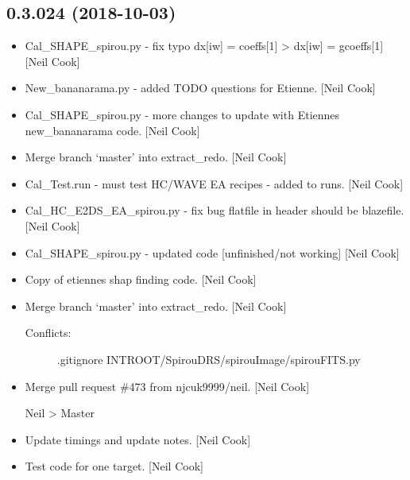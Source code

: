 \documentclass[a4paper,10pt,english]{report}
\begin{document}
\subsection{0.3.024 (2018-10-03)}
\label{\detokenize{misc/changelog:id306}}\begin{itemize}
\item {} 
Cal\_SHAPE\_spirou.py - fix typo dx{[}iw{]} = coeffs{[}1{]} \textendash{}\textgreater{} dx{[}iw{]} =
gcoeffs{[}1{]} {[}Neil Cook{]}

\item {} 
New\_bananarama.py - added TODO questions for Etienne. {[}Neil Cook{]}

\item {} 
Cal\_SHAPE\_spirou.py - more changes to update with Etiennes
new\_bananarama code. {[}Neil Cook{]}

\item {} 
Merge branch ‘master’ into extract\_redo. {[}Neil Cook{]}

\item {} 
Cal\_Test.run - must test HC/WAVE EA recipes - added to runs. {[}Neil
Cook{]}

\item {} 
Cal\_HC\_E2DS\_EA\_spirou.py - fix bug flatfile in header should be
blazefile. {[}Neil Cook{]}

\item {} 
Cal\_SHAPE\_spirou.py - updated code {[}unfinished/not working{]} {[}Neil
Cook{]}

\item {} 
Copy of etiennes shap finding code. {[}Neil Cook{]}

\item {} 
Merge branch ‘master’ into extract\_redo. {[}Neil Cook{]}
\begin{description}
\item[{Conflicts:}] \leavevmode
.gitignore
INTROOT/SpirouDRS/spirouImage/spirouFITS.py

\end{description}

\item {} 
Merge pull request \#473 from njcuk9999/neil. {[}Neil Cook{]}

Neil \textendash{}\textgreater{} Master

\item {} 
Update timings and update notes. {[}Neil Cook{]}

\item {} 
Test code for one target. {[}Neil Cook{]}


\end{itemize}
\end{document}
